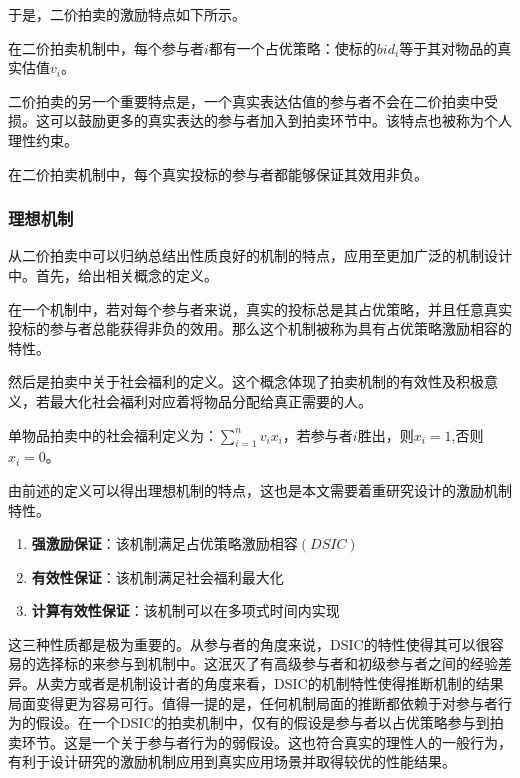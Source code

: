 \documentclass[promaster]{thesis-uestc}
\begin{document}
 于是，二价拍卖的激励特点如下所示。
 
 \begin{corollary}[二价拍卖中的激励]
     在二价拍卖机制中，每个参与者$i$都有一个占优策略：使标的$bid_i$等于其对物品的真实估值$v_i$。
 \end{corollary}

二价拍卖的另一个重要特点是，一个真实表达估值的参与者不会在二价拍卖中受损。这可以鼓励更多的真实表达的参与者加入到拍卖环节中。该特点也被称为个人理性约束。

\begin{corollary}[效用非负性]
    在二价拍卖机制中，每个真实投标的参与者都能够保证其效用非负。
\end{corollary}

\subsubsection{理想机制}

从二价拍卖中可以归纳总结出性质良好的机制的特点，应用至更加广泛的机制设计中。首先，给出相关概念的定义。

\begin{definition}
    在一个机制中，若对每个参与者来说，真实的投标总是其占优策略，并且任意真实投标的参与者总能获得非负的效用。那么这个机制被称为具有占优策略激励相容的特性。
\end{definition}

然后是拍卖中关于社会福利的定义。这个概念体现了拍卖机制的有效性及积极意义，若最大化社会福利对应着将物品分配给真正需要的人。

\begin{definition}[社会福利]
    单物品拍卖中的社会福利定义为：$\sum_{i=1}^{n}{v_ix_i}$，若参与者$i$胜出，则$x_i=1$,否则$x_i=0$。
\end{definition}

由前述的定义可以得出理想机制的特点，这也是本文需要着重研究设计的激励机制特性。

\begin{enumerate}
    \item \textbf{强激励保证}：该机制满足占优策略激励相容$(DSIC)$
    \item  \textbf{有效性保证}：该机制满足社会福利最大化
    \item \textbf{计算有效性保证}：该机制可以在多项式时间内实现
\end{enumerate}

这三种性质都是极为重要的。从参与者的角度来说，DSIC的特性使得其可以很容易的选择标的来参与到机制中。这泯灭了有高级参与者和初级参与者之间的经验差异。从卖方或者是机制设计者的角度来看，DSIC的机制特性使得推断机制的结果局面变得更为容易可行。值得一提的是，任何机制局面的推断都依赖于对参与者行为的假设。在一个DSIC的拍卖机制中，仅有的假设是参与者以占优策略参与到拍卖环节。这是一个关于参与者行为的弱假设。这也符合真实的理性人的一般行为，有利于设计研究的激励机制应用到真实应用场景并取得较优的性能结果。
\end{document}
